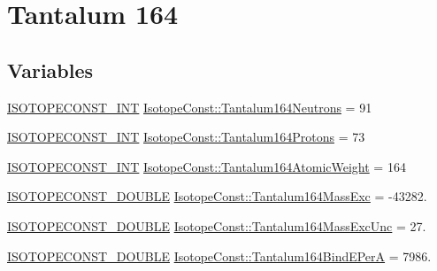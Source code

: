 \hypertarget{group___isotope_const-_tantalum-_ta164}{}\section{Tantalum 164}
\label{group___isotope_const-_tantalum-_ta164}
\subsection*{Variables}
\begin{DoxyCompactItemize}
\item 
\mbox{\hyperlink{group___isotope_const-_macros_ga5f18360b3e99483a35c32d789e62621c}{I\+S\+O\+T\+O\+P\+E\+C\+O\+N\+S\+T\+\_\+\+I\+NT}} \mbox{\hyperlink{group___isotope_const-_tantalum-_ta164_ga2b1ce994cc1aa6ddab61cd9e4870a3e5}{Isotope\+Const\+::\+Tantalum164\+Neutrons}} = 91
\item 
\mbox{\hyperlink{group___isotope_const-_macros_ga5f18360b3e99483a35c32d789e62621c}{I\+S\+O\+T\+O\+P\+E\+C\+O\+N\+S\+T\+\_\+\+I\+NT}} \mbox{\hyperlink{group___isotope_const-_tantalum-_ta164_gab9a4f1ac3034b336626e3701eca95ff7}{Isotope\+Const\+::\+Tantalum164\+Protons}} = 73
\item 
\mbox{\hyperlink{group___isotope_const-_macros_ga5f18360b3e99483a35c32d789e62621c}{I\+S\+O\+T\+O\+P\+E\+C\+O\+N\+S\+T\+\_\+\+I\+NT}} \mbox{\hyperlink{group___isotope_const-_tantalum-_ta164_ga4ea3f95c351140d4b93630a5efa4f5aa}{Isotope\+Const\+::\+Tantalum164\+Atomic\+Weight}} = 164
\item 
\mbox{\hyperlink{group___isotope_const-_macros_ga8f45a7272ce02c0b4c65c44636ed719a}{I\+S\+O\+T\+O\+P\+E\+C\+O\+N\+S\+T\+\_\+\+D\+O\+U\+B\+LE}} \mbox{\hyperlink{group___isotope_const-_tantalum-_ta164_gab3be3730cb7226565f2d2d68acb64138}{Isotope\+Const\+::\+Tantalum164\+Mass\+Exc}} = -\/43282.
\item 
\mbox{\hyperlink{group___isotope_const-_macros_ga8f45a7272ce02c0b4c65c44636ed719a}{I\+S\+O\+T\+O\+P\+E\+C\+O\+N\+S\+T\+\_\+\+D\+O\+U\+B\+LE}} \mbox{\hyperlink{group___isotope_const-_tantalum-_ta164_ga120ab02aa2e09f65f77483bdb59e263b}{Isotope\+Const\+::\+Tantalum164\+Mass\+Exc\+Unc}} = 27.
\item 
\mbox{\hyperlink{group___isotope_const-_macros_ga8f45a7272ce02c0b4c65c44636ed719a}{I\+S\+O\+T\+O\+P\+E\+C\+O\+N\+S\+T\+\_\+\+D\+O\+U\+B\+LE}} \mbox{\hyperlink{group___isotope_const-_tantalum-_ta164_gaf4278f6d588068d24af461cd5b2ff6bd}{Isotope\+Const\+::\+Tantalum164\+Bind\+E\+PerA}} = 7986.
\item 

\end{DoxyCompactItemize}
